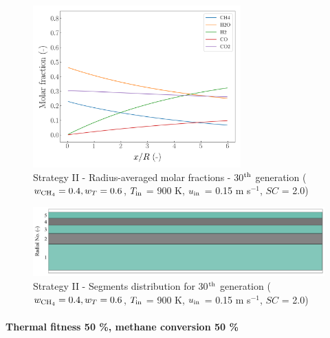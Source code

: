 \documentclass[preprint,12pt]{elsarticle}
\begin{document}
\begin{figure}[h!]
\centering
\includegraphics[width=80mm]{results/5Eq/40C_60T/GEN30-AVG.png}
\caption{\label{fig:5RES4060G30-avg} Strategy II - Radius-averaged molar fractions -  30$^{\rm{th}}$ generation ($w_{\rm{CH_4}} = 0.4, w_T = 0.6$, $T_{\rm{in}}$ = 900 K, $u_{\rm{in}}$ = 0.15 m s$^{-1}$, $SC$ = 2.0)}
\end{figure}

\begin{figure}[h!]
\centering
\includegraphics[width=120mm]{results/segments/5segEq/40C60T/seg.png}
\caption{\label{fig:30L6040G1-TField} Strategy II - Segments distribution for 30$^{\rm{th}}$ generation ($w_{\rm{CH_4}} = 0.4, w_T = 0.6$, $T_{\rm{in}}$ = 900 K, $u_{\rm{in}}$ = 0.15 m s$^{-1}$, $SC$ = 2.0)}
\end{figure}



\clearpage





\paragraph{Thermal fitness 50 \%, methane conversion 50 \%} \hspace{0pt} \\
\noindent 
\end{document}
